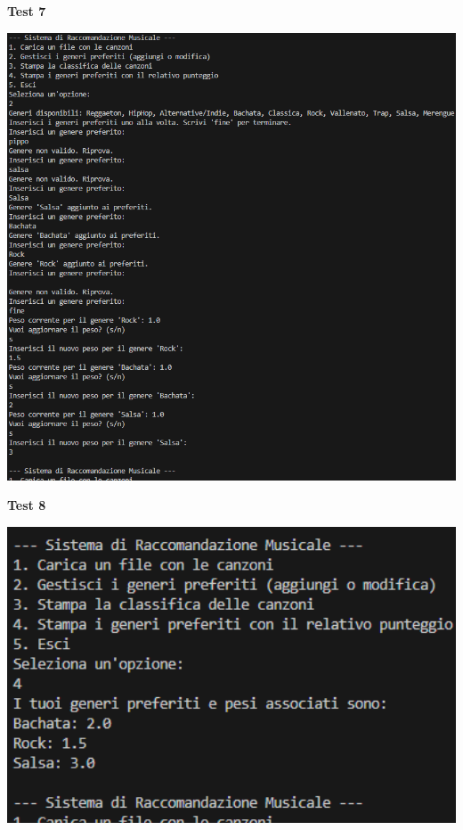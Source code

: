 \documentclass[a4paper,11pt]{article}
\begin{document}
    \newpage
    \begin{center}
        \textbf{Test 7}
        \par
        \vspace{0.5cm}
        \includegraphics[width=1\textwidth]{Immagini/Tests/htest7}
    \end{center}
    \begin{center}
        \textbf{Test 8}
        \par
        \vspace{0.5cm}
        \includegraphics[width=1\textwidth]{Immagini/Tests/htest8}
    \end{center}
\end{document}
